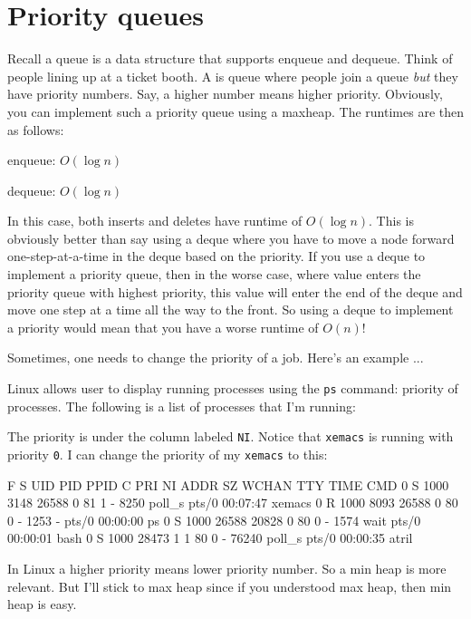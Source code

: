 \section{Priority queues}

Recall a queue is a data structure that supports
enqueue and dequeue.
Think of people lining up at a ticket booth.
A  is queue where people join a queue \textit{but}
they have priority numbers.
Say, a higher number means higher priority.
Obviously, you can implement such a priority queue
using a maxheap.
The runtimes are then as follows:
\begin{tightlist}
  \item enqueue: $O(\log n)$
  \item dequeue: $O(\log n)$
\end{tightlist}


In this case, both inserts and deletes have runtime of $O(\log n)$.
This is obviously better than say using a deque where you have to 
move a node forward one-step-at-a-time in the deque based on the priority.
If you use a deque to implement
a priority queue, then in the worse case, where value enters the
priority queue with highest priority, this value will enter the
end of the deque and move one step at a time all the way to the front.
So using a deque to implement a priority would mean that you have a
worse runtime of $O(n)$!


Sometimes, one needs to change the priority of a job.
Here's an example ...

Linux allows user to display running processes using the
\verb!ps! command:
priority of processes.
The following is a list of processes that I'm running:
{\scriptsize
{}
}
The priority is under the column labeled \texttt{NI}.
Notice that \texttt{xemacs} is running with priority \texttt{0}.
I can change the priority of my \texttt{xemacs} to this:
{\scriptsize
\begin{console}
F S   UID   PID  PPID  C PRI  NI ADDR SZ WCHAN  TTY          TIME CMD
0 S  1000  3148 26588  0  81   1 -  8250 poll_s pts/0    00:07:47 xemacs
0 R  1000  8093 26588  0  80   0 -  1253 -      pts/0    00:00:00 ps
0 S  1000 26588 20828  0  80   0 -  1574 wait   pts/0    00:00:01 bash
0 S  1000 28473     1  1  80   0 - 76240 poll_s pts/0    00:00:35 atril
\end{console}
}
In Linux a higher priority means lower priority number.
So a min heap is more relevant.
But I'll stick to max heap since if you understood max heap, then
min heap is easy.

